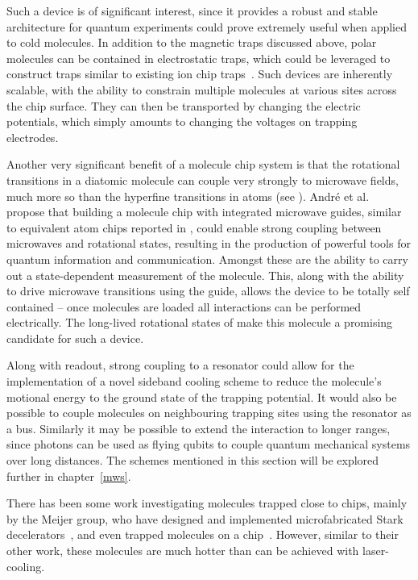Such a device is of significant interest, since it provides a robust and stable
architecture for quantum experiments could prove extremely useful when applied
to cold molecules. In addition to the magnetic traps discussed above, polar
molecules can be contained in electrostatic traps, which could be leveraged to
construct traps similar to existing ion chip traps~\cite{Andre2006,
Romaszko2020}. Such devices are inherently scalable, with the ability to
constrain multiple molecules at various sites across the chip surface. They can
then be transported by changing the electric potentials, which simply amounts
to changing the voltages on trapping electrodes.

Another very significant benefit of a molecule chip system is that the
rotational transitions in a diatomic molecule can couple very strongly to
microwave fields, much more so than the hyperfine transitions in atoms (see
). Andr\'e et al.~\cite{Andre2006} propose that
building a molecule chip with integrated microwave guides, similar to
equivalent atom chips reported in , could enable
strong coupling between microwaves and rotational states, resulting in the
production of powerful tools for quantum information and communication. Amongst
these are the ability to carry out a state-dependent measurement of the
molecule. This, along with the ability to drive microwave transitions using the
guide, allows the device to be totally self contained -- once molecules are
loaded all interactions can be performed electrically. The long-lived
rotational states of \CaF{} make this molecule a promising candidate for such a
device.

Along with readout, strong coupling to a resonator could allow for the
implementation of a novel sideband cooling scheme to reduce the molecule's
motional energy to the ground state of the trapping potential. It would also be
possible to couple molecules on neighbouring trapping sites using the resonator as a bus.
Similarly it may be possible to extend the interaction to longer ranges, since
photons can be used as flying qubits to couple quantum mechanical systems over
long distances. The schemes mentioned in this section will be explored further
in chapter~\ref{mws}.

There has been some work investigating molecules trapped close to chips, mainly by
the Meijer group, who have designed and implemented microfabricated Stark
decelerators~\cite{Meek2008}, and even trapped molecules on a
chip~\cite{Meek2009}. However, similar to their other work, these molecules are
much hotter than can be achieved with laser-cooling.


